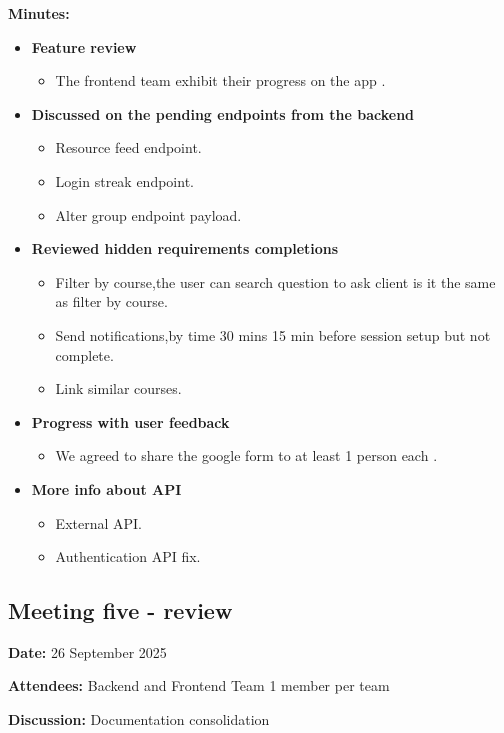\textbf{Minutes:}
\begin{itemize}
    \item \textbf{Feature review}
    \begin{itemize}
        \item The frontend team exhibit their progress on the app .
    \end{itemize}

    \item \textbf{Discussed on the pending endpoints from the backend}
    \begin{itemize}
        \item Resource feed endpoint.
        \item Login streak endpoint.
        \item Alter group endpoint payload.
    \end{itemize}
    
    \item \textbf{Reviewed hidden requirements completions}
    \begin{itemize}
        \item Filter by course,the user can  search question to ask client is it the same as filter by course.
        \item Send notifications,by time 30 mins 15 min before session setup but not complete.
        \item Link similar courses.
        
    \end{itemize}
    \item \textbf{Progress with user feedback}
    \begin{itemize}
        \item We agreed to share the google form to at least 1 person each .
    \end{itemize}
    
    \item \textbf{More info about API}
    \begin{itemize}
        \item External API.
        \item Authentication API fix.
    \end{itemize}

\end{itemize}

\subsection{Meeting five - review}
\textbf{Date:} 26 September 2025 \par
\textbf{Attendees:} Backend and Frontend Team 1 member per team \par
\textbf{Discussion:} Documentation consolidation

